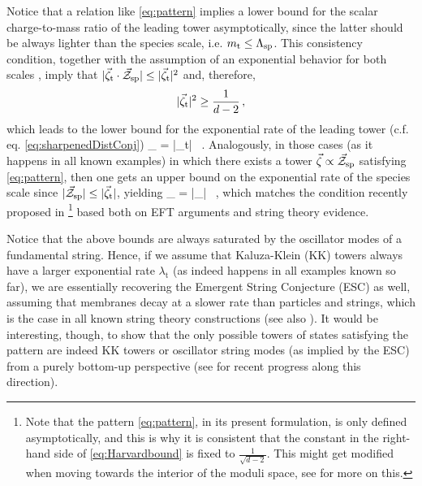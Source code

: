 Notice that a relation like \eqref{eq:pattern} implies a lower bound for the scalar charge-to-mass ratio of the leading tower asymptotically, since the latter should be always lighter than the species scale, i.e. $m_{\rm t}\leq \Lambda_{\text{sp}}$. This consistency condition, together with the assumption of an exponential behavior for both scales \cite{Ooguri:2006in}, imply that $|\vec{\zeta}_{\rm t} \cdot \vec{\mathcal{Z}}_{\text{sp}}| \leq |\vec{\zeta}_{\rm t}|^2$ and, therefore,
%
\begin{equation}\label{eq:Rudelius}
	|\vec{\zeta}_{\rm t}|^2 \geq \frac{1}{d-2}\, ,
\end{equation}
%
which leads to the lower bound for the exponential rate of the leading tower (c.f. eq. \eqref{eq:sharpenedDistConj})
%
\beq
	\lambda_{} = |\vec{\zeta}_{\rm t}| \geq {}\, .
\eeq
%
Analogously, in those cases (as it happens in all known examples) in which there exists a tower $\vec{\zeta}\propto\vec{\mathcal{Z}}_{\rm sp}$ satisfying \eqref{eq:pattern}, then one gets an upper bound on the exponential rate of the species scale since $|\vec{\mathcal{Z}}_{\rm sp}|\leq |\vec{\zeta}_{\rm t}| $, yielding
%
\beq\label{eq:Harvardbound}
	\lambda_{} = |_{}| \leq {}\, ,
\eeq
%
which matches the condition recently proposed in \cite{vandeHeisteeg:2023ubh}\footnote{Note that the pattern \eqref{eq:pattern}, in its present formulation, is only defined asymptotically, and this is why it is consistent that the constant in the right-hand side of \eqref{eq:Harvardbound} is fixed to $\frac{1}{\sqrt{d-2}}$. This might get modified when moving towards the interior of the moduli space, see \cite{Bedroya:2024uva} for more on this.} based both on EFT arguments and string theory evidence.
	
Notice that the above bounds are always saturated by the oscillator modes of a fundamental string. Hence, if we assume that Kaluza-Klein (KK) towers always have a larger exponential rate $\lambda_{\text{t}}$ (as indeed happens in all examples known so far), we are essentially recovering the Emergent String Conjecture (ESC) \cite{Lee:2019wij} as well, assuming that membranes decay at a slower rate than particles and strings, which is the case in all known string theory constructions (see also \cite{Alvarez-Garcia:2021pxo}). It would be interesting, though, to show that the only possible towers of states satisfying the pattern are indeed KK towers or oscillator string modes (as implied by the ESC) from a purely bottom-up perspective (see \cite{Basile:2023blg} for recent progress along this direction).
	
